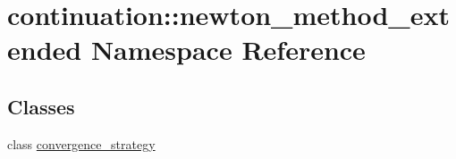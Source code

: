 \hypertarget{namespacecontinuation_1_1newton__method__extended}{\section{continuation\-:\-:newton\-\_\-method\-\_\-extended Namespace Reference}
\label{namespacecontinuation_1_1newton__method__extended}
}
\subsection*{Classes}
\begin{DoxyCompactItemize}
\item 
class \hyperlink{classcontinuation_1_1newton__method__extended_1_1convergence__strategy}{convergence\-\_\-strategy}
\end{DoxyCompactItemize}
